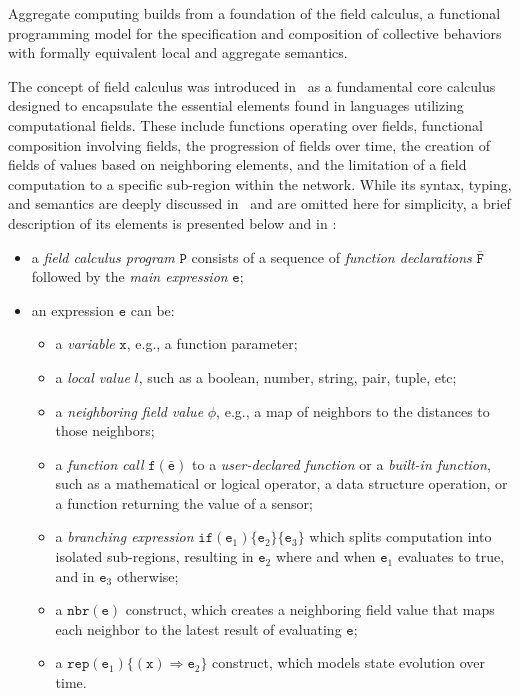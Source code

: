 Aggregate computing builds from a foundation of the field calculus, a functional programming model for the specification and composition of collective behaviors with formally equivalent local and aggregate semantics.

The concept of field calculus was introduced in~\cite{Viroli2013} as a fundamental core calculus designed to encapsulate the essential elements found in languages utilizing computational fields. These include functions operating over fields, functional composition involving fields, the progression of fields over time, the creation of fields of values based on neighboring elements, and the limitation of a field computation to a specific sub-region within the network. While its syntax, typing, and semantics are deeply discussed in~\cite{Viroli2019} and are omitted here for simplicity, a brief description of its elements is presented below and in :

\begin{itemize}
    \item a \textit{field calculus program} $\texttt{P}$ consists of a sequence of \textit{function declarations} $\bar{\texttt{F}}$ followed by the \textit{main expression} $\texttt{e}$;
    \item an expression $\texttt{e}$ can be:
          \begin{itemize}
              \item a \textit{variable} $\texttt{x}$, e.g., a function parameter;
              \item a \textit{local value} $l$, such as a boolean, number, string, pair, tuple, etc;
              \item a \textit{neighboring field value} $\phi$, e.g., a map of
                    neighbors to the distances to those neighbors;
              \item a \textit{function call} $\texttt{f}(\bar{\texttt{e}})$ to a \textit{user-declared function} or a \textit{built-in function}, such
                    as a mathematical or logical operator, a data structure operation, or a function returning the value of a sensor;
              \item a \textit{branching expression} $\texttt{if} (\texttt{e}_1)\{\texttt{e}_2\}\{\texttt{e}_3\}$ which splits computation into isolated sub-regions, resulting in $\texttt{e}_2$ where and when $\texttt{e}_1$ evaluates to true, and in $\texttt{e}_3$ otherwise;
              \item a $\texttt{nbr}(\texttt{e})$ construct, which creates a neighboring field value that maps each neighbor to the latest result of evaluating $\texttt{e}$;
              \item a $\texttt{rep}(\texttt{e}_1)\{(\texttt{x})\Rightarrow \texttt{e}_2\}$ construct, which models state evolution over time.
          \end{itemize}
\end{itemize}

